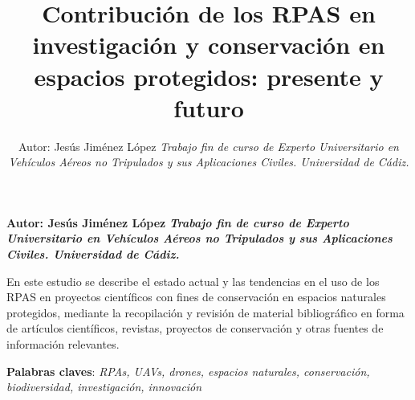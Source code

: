 \documentclass[twocolumn]{extarticle}
\title{Contribución de los RPAS en investigación y conservación en espacios
protegidos: presente y futuro\vspace{0.25in}  }
\author{\Large Autor: Jesús Jiménez López\vspace{0.05in} \newline\normalsize\emph{Trabajo fin de curso de Experto Universitario en Vehículos Aéreos no
Tripulados y sus Aplicaciones Civiles. Universidad de Cádiz.}  }
\date{}
\newcommand*{\authorfont}{\fontfamily{phv}\selectfont}
\renewenvironment{abstract}
 {{%
    \setlength{\leftmargin}{0mm}
    \setlength{\rightmargin}{\leftmargin}%
  }%
  \relax}
 {\endlist}
\begin{document}
	
%

{%

\setlength{\parindent}{0pt}
\thispagestyle{plain}

{\fontsize{16}{20}\selectfont\raggedright 
\maketitle  %

}

 
{
   \vskip 13.5pt\relax \normalsize\fontsize{8}{10} 
 \textbf{\authorfont Autor: Jesús Jiménez López} \hskip 10pt \vskip 5pt  \bf\emph{\small Trabajo fin de curso de Experto Universitario en Vehículos Aéreos no
Tripulados y sus Aplicaciones Civiles. Universidad de Cádiz.}   

}

}







\begin{abstract}

    \hbox{\vrule height .2pt width 19.10pc}

    \vskip 6pt %

\noindent En este estudio se describe el estado actual y las tendencias en el uso
de los RPAS en proyectos científicos con fines de conservación en
espacios naturales protegidos, mediante la recopilación y revisión de
material bibliográfico en forma de artículos científicos, revistas,
proyectos de conservación y otras fuentes de información relevantes.


\vskip 8pt \noindent \textbf{Palabras claves}: \emph{RPAs, UAVs, drones, espacios naturales, conservación, biodiversidad,
investigación, innovación} \par

    \hbox{\vrule height .2pt width 19.10pc}



\end{abstract}


{
\fontsize{8}{10} 
\hypersetup{linkcolor=black}
\setcounter{tocdepth}{2}
\tableofcontents
}


\vskip 6.5pt
\end{document}
